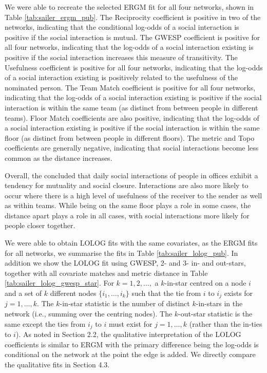 \documentclass[
]{statsoc}
\begin{document}
We were able to recreate the selected ERGM fit for all four networks,
shown in Table \ref{tab:sailer_ergm_pub}. The Reciprocity coefficient is
positive in two of the networks, indicating that the conditional
log-odds of a social interaction is positive if the social interaction
is mutual. The GWESP coefficient is positive for all four networks,
indicating that the log-odds of a social interaction existing is
positive if the social interaction increases this measure of
transitivity. The Usefulness coefficient is positive for all four
networks, indicating that the log-odds of a social interaction existing
is positively related to the usefulness of the nominated person. The
Team Match coefficient is positive for all four networks, indicating
that the log-odds of a social interaction existing is positive if the
social interaction is within the same team (as distinct from between
people in different teams). Floor Match coefficients are also positive,
indicating that the log-odds of a social interaction existing is
positive if the social interaction is within the same floor (as distinct
from between people in different floors). The metric and Topo
coefficients are generally negative, indicating that social interactions
become less common as the distance increases.

Overall, the \cite{Sailer2012} concluded that daily social interactions
of people in offices exhibit a tendency for mutuality and social
closure. Interactions are also more likely to occur where there is a
high level of usefulness of the receiver to the sender as well as within
teams. While being on the same floor plays a role in some cases, the
distance apart plays a role in all cases, with social interactions more
likely for people closer together.

We were able to obtain LOLOG fits with the same covariates, as the ERGM
fits for all networks, we summarise the fits in Table
\ref{tab:sailer_lolog_pub}. In addition we show the LOLOG fit using
GWESP, 2- and 3- in- and out-stars, together with all covariate matches
and metric distance in Table \ref{tab:sailer_lolog_gwesp_star}. For
\(k=1, 2, \ldots,\) a \(k\)-in-star centred on a node \(i\) and a set of
\(k\) different nodes \(\{i_1, \ldots, i_{k}\}\) such that the tie from
\(i\) to \(i_{j}\) exists for \(j=1, \ldots, k\). The \(k\)-in-star
statistic is the number of distinct \(k\)-in-stars in the network (i.e.,
summing over the centring nodes). The \(k\)-out-star statistic is the
same except the ties from \(i_{j}\) to \(i\) must exist for
\(j=1, \ldots, k\) (rather than the in-ties to \(i\)). As noted in
Section 2.2, the qualitative interpretation of the LOLOG coefficients is
similar to ERGM with the primary difference being the log-odds is
conditional on the network at the point the edge is added. We directly
compare the qualitative fits in Section 4.3.
\end{document}
